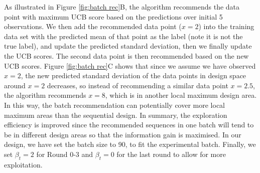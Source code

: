 As illustrated in Figure \ref{fig:batch rec}B, the algorithm recommends the data point with maximum UCB score based on the predictions over initial 5 observations.  
We then add the recommended data point ($x = 2$) into the training data set with the predicted mean of that point as the label (note it is not the true label), and update the predicted standard deviation, then we finally update the UCB scores. 
The second data point is then recommended based on the new UCB scores.   
Figure \ref{fig:batch rec}C shows that since we assume we have observed $x = 2$, the new predicted standard deviation of the data points in design space around $x =2$  decreases, so instead of recommending a similar data point $x = 2.5$, the algorithm recommends $x = 8$, which is in another local maximum design area. 
In this way, the batch recommendation can potentially cover more local maximum areas than the sequential design. 
In summary, the exploration efficiency is improved since the recommended sequences in one batch will tend to be in different design areas so that the information gain is maximised. 
In our design, we have set the batch size to 90, to fit the experimental batch.
Finally, we set $\beta_t = 2$ for Round 0-3 and $\beta_t = 0$ for the last round to allow for more exploitation.
